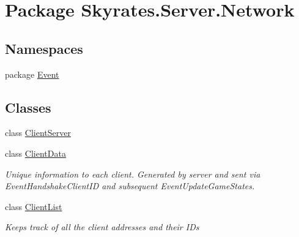 \hypertarget{namespace_skyrates_1_1_server_1_1_network}{\section{Package Skyrates.\-Server.\-Network}
\label{namespace_skyrates_1_1_server_1_1_network}
}
\subsection*{Namespaces}
\begin{DoxyCompactItemize}
\item 
package \hyperlink{namespace_skyrates_1_1_server_1_1_network_1_1_event}{Event}
\end{DoxyCompactItemize}
\subsection*{Classes}
\begin{DoxyCompactItemize}
\item 
class \hyperlink{class_skyrates_1_1_server_1_1_network_1_1_client_server}{Client\-Server}
\item 
class \hyperlink{class_skyrates_1_1_server_1_1_network_1_1_client_data}{Client\-Data}
\begin{DoxyCompactList}\small\item\em Unique information to each client. Generated by server and sent via Event\-Handshake\-Client\-I\-D and subsequent Event\-Update\-Game\-States. \end{DoxyCompactList}\item 
class \hyperlink{class_skyrates_1_1_server_1_1_network_1_1_client_list}{Client\-List}
\begin{DoxyCompactList}\small\item\em Keeps track of all the client addresses and their I\-Ds \end{DoxyCompactList}\end{DoxyCompactItemize}
